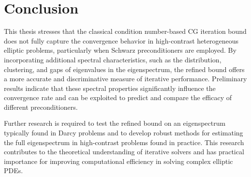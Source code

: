 \chapter{Conclusion}\label{ch:conclusion}
This thesis stresses that the classical condition number-based CG iteration bound does not fully capture the convergence behavior in high-contrast heterogeneous elliptic problems, particularly when Schwarz preconditioners are employed. By incorporating additional spectral characteristics, such as the distribution, clustering, and gaps of eigenvalues in the eigenspectrum, the refined bound offers a more accurate and discriminative measure of iterative performance. Preliminary results indicate that these spectral properties significantly influence the convergence rate and can be exploited to predict and compare the efficacy of different preconditioners. 

Further research is required to test the refined bound on an eigenspectrum typically found in Darcy problems and to develop robust methods for estimating the full eigenspectrum in high-contrast problems found in practice. This research contributes to the theoretical understanding of iterative solvers and has practical importance for improving computational efficiency in solving complex elliptic PDEs.